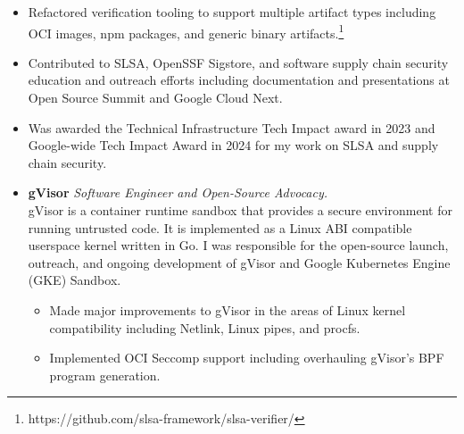 \documentclass{article}
\begin{document}
\begin{list}{}{
    \setlength{\leftmargin}{0cm}	%
    \setlength{\parsep}{0.15cm}
}
\begin{itemize}
\begin{itemize}
            \item Refactored verification tooling to support multiple artifact
                types including OCI images, npm packages, and generic binary
                artifacts.\footnote{https://github.com/slsa-framework/slsa-verifier/}


            \item Contributed to SLSA, OpenSSF Sigstore, and software supply
                chain security education and outreach efforts including
                documentation and presentations at Open Source Summit and Google
                Cloud Next.

                \item Was awarded the Technical Infrastructure Tech Impact
                    award in 2023 and Google-wide Tech Impact Award in 2024 for
                    my work on SLSA and supply chain security.

        \end{itemize}

    \end{itemize}

    \begin{itemize}

        \item \textbf{gVisor} \emph{Software Engineer and Open-Source Advocacy.}\\
            gVisor is a container runtime sandbox that provides a secure
            environment for running untrusted code. It is implemented as a
            Linux ABI compatible userspace kernel written in Go. I was
            responsible for the open-source launch, outreach, and ongoing
            development of gVisor and Google Kubernetes Engine (GKE) Sandbox.

        \begin{itemize}

            \item Made major improvements to gVisor in the areas of Linux kernel
                compatibility including Netlink, Linux pipes, and procfs.

            \item Implemented OCI Seccomp support including overhauling gVisor's
                BPF program generation.


\end{itemize}
\end{itemize}
\end{list}
\end{document}
